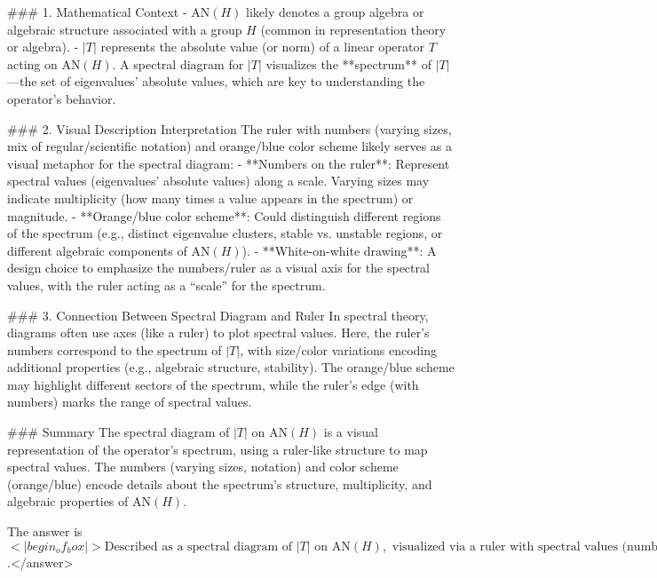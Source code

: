 ### 1. Mathematical Context  
- \( \text{AN}(H) \) likely denotes a group algebra or algebraic structure associated with a group \( H \) (common in representation theory or algebra).  
- \( |T| \) represents the absolute value (or norm) of a linear operator \( T \) acting on \( \text{AN}(H) \). A spectral diagram for \( |T| \) visualizes the **spectrum** of \( |T| \)—the set of eigenvalues’ absolute values, which are key to understanding the operator’s behavior.  

### 2. Visual Description Interpretation  
The ruler with numbers (varying sizes, mix of regular/scientific notation) and orange/blue color scheme likely serves as a visual metaphor for the spectral diagram:  
- **Numbers on the ruler**: Represent spectral values (eigenvalues’ absolute values) along a scale. Varying sizes may indicate multiplicity (how many times a value appears in the spectrum) or magnitude.  
- **Orange/blue color scheme**: Could distinguish different regions of the spectrum (e.g., distinct eigenvalue clusters, stable vs. unstable regions, or different algebraic components of \( \text{AN}(H) \)).  
- **White-on-white drawing**: A design choice to emphasize the numbers/ruler as a visual axis for the spectral values, with the ruler acting as a “scale” for the spectrum.  

### 3. Connection Between Spectral Diagram and Ruler  
In spectral theory, diagrams often use axes (like a ruler) to plot spectral values. Here, the ruler’s numbers correspond to the spectrum of \( |T| \), with size/color variations encoding additional properties (e.g., algebraic structure, stability). The orange/blue scheme may highlight different sectors of the spectrum, while the ruler’s edge (with numbers) marks the range of spectral values.  

### Summary  
The spectral diagram of \( |T| \) on \( \text{AN}(H) \) is a visual representation of the operator’s spectrum, using a ruler-like structure to map spectral values. The numbers (varying sizes, notation) and color scheme (orange/blue) encode details about the spectrum’s structure, multiplicity, and algebraic properties of \( \text{AN}(H) \).  

The answer is \(<|begin_of_box|>\text{Described as a spectral diagram of } |T| \text{ on } \text{AN}(H), \text{ visualized via a ruler with spectral values (numbers) and color-coded regions}<|end_of_box|>\).</answer>